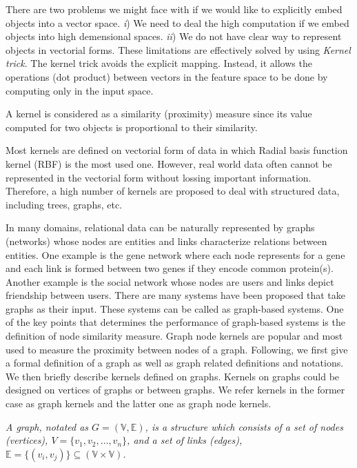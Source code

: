 There are two problems we might face with if we would like to explicitly embed objects into a vector space. \textit{i}) We need to deal the high computation if we embed objects into high demensional spaces. \textit{ii}) We do not have clear way to represent objects in vectorial forms. These limitations are effectively solved by using \textit{Kernel trick}. The kernel trick avoids the explicit mapping. Instead, it allows the operations (dot product) between vectors in the feature space to be done by computing only in the input space.

A kernel is considered as a similarity (proximity) measure since its value computed for two objects is proportional to their similarity.

Most kernels are defined on vectorial form of data in which Radial basis function kernel (RBF) \cite{vert2004primer} is the most used one. However, real world data often cannot be represented in the vectorial form without lossing important information. Therefore, a high number of kernels are proposed to deal with structured data, including trees, graphs, etc. 

In many domains, relational data can be naturally represented by graphs (networks) whose nodes are entities and links characterize relations between entities. One example is the gene network where each node represents for a gene and each link is formed between two genes if they encode common protein(s). Another example is the social network whose nodes are users and links depict friendship between users. There are many systems have been proposed that take graphs as their input. These systems can be called as graph-based systems. One of the key points that determines the performance of graph-based systems is the definition of node similarity measure. Graph node kernels are popular and most used to measure the proximity between nodes of a graph. Following, we first give a formal definition of a graph as well as graph related definitions and notations. We then briefly describe kernels defined on graphs. Kernels on graphs could be designed on vertices of graphs or between graphs. We refer kernels in the former case as graph kernels and the latter one as graph node kernels.
\begin{definition}{}
\textit{A graph, notated as $G = \left(  \mathbb{V}, \mathbb{E} \right)$, is a structure which consists of a set of nodes (vertices), $V = \lbrace v_1, v_2,\ldots, v_n\rbrace$, and a set of links (edges), $\mathbb{E} = \lbrace (v_i, v_j)\rbrace \subseteq (\mathbb{V}\times \mathbb{V})$.}
\end{definition}

